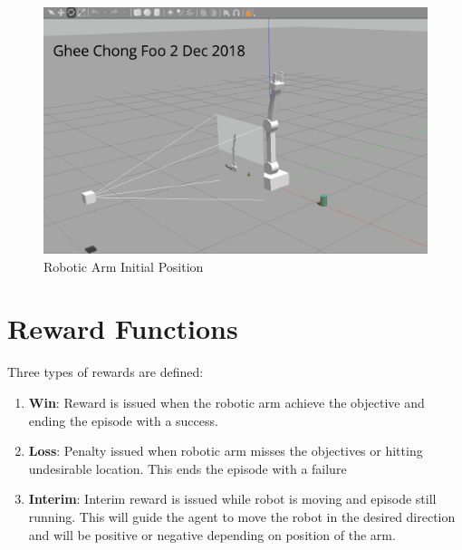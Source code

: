 \documentclass[10pt,journal,compsoc]{IEEEtran}
\begin{document}
\begin{figure}[thpb]
      \centering
      \includegraphics[width=\linewidth]{Arm_init_pos.png}
      \caption{Robotic Arm Initial Position}
      \label{fig:Arm_init_pos}
\end{figure}






\section{Reward Functions}

Three types of rewards are defined:
\begin{enumerate}
    \item \textbf{Win}: Reward is issued when the robotic arm achieve the objective and ending the episode with a success.
    \item \textbf{Loss}: Penalty issued when robotic arm misses the objectives or hitting undesirable location.  This ends the episode with a failure
    \item \textbf{Interim}: Interim reward is issued while robot is moving and episode still running. This will guide the agent to move the robot in the desired direction and will be positive or negative depending on position of the arm.
\end{enumerate}
\end{document}
